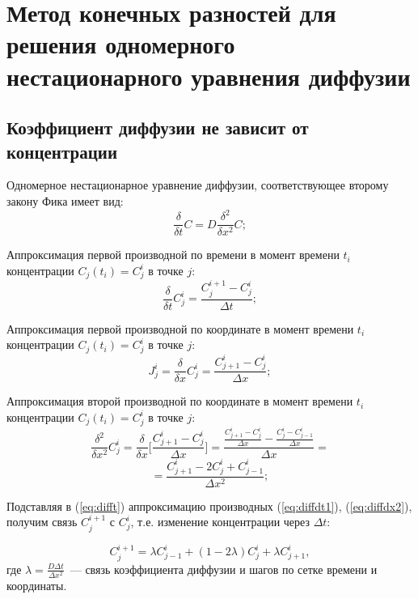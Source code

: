 \section{Метод конечных разностей для решения одномерного нестационарного уравнения диффузии}
\subsection{Коэффициент диффузии не зависит от концентрации}
Одномерное нестационарное уравнение диффузии, соответствующее второму закону Фика имеет вид:
\begin{equation}\label{eq:difft}
	\frac{\delta}{\delta t} C = D\frac{\delta^{2}}{\delta x^2} C;
\end{equation}

Аппроксимация первой производной по времени в момент времени $t_{i}$ концентрации $C_{j}(t_{i}) = C^{i}_{j}$ в точке $j$:
\begin{equation}\label{eq:diffdt1}
	\frac{\delta}{\delta t} C^{i}_{j} = \frac{C^{i+1}_{j} - C^{i}_{j}}{\Delta t};
\end{equation}

Аппроксимация первой производной по координате в момент времени $t_{i}$ концентрации $C_{j}(t_{i}) = C^{i}_{j}$ в точке $j$:
\begin{equation}\label{eq:diffdx1}
	J^{i}_{j} = \frac{\delta}{\delta x} C^{i}_{j} = \frac{C^{i}_{j+1} - C^{i}_{j}}{\Delta x};
\end{equation}

Аппроксимация второй производной по координате в момент времени $t_{i}$ концентрации $C_{j}(t_{i}) = C^{i}_{j}$ в точке $j$:
\begin{equation*}
	\frac{\delta^{2}}{\delta x^{2}} C^{i}_{j} = \frac{\delta}{\delta x}\bigg[ \frac{C^{i}_{j+1} - C^{i}_{j}}{\Delta x} \bigg] = \frac{ \frac{C^{i}_{j+1} - C^{i}_{j}}{\Delta x} - \frac{C^{i}_{j} - C^{i}_{j-1}}{\Delta x}}{\Delta x} = 
\end{equation*}
\begin{equation}\label{eq:diffdx2}
	= \frac{C^{i}_{j+1} - 2C^{i}_{j} + C^{i}_{j-1}}{\Delta x^2};
\end{equation}

Подставляя в (\ref{eq:difft}) аппроксимацию производных (\ref{eq:diffdt1}), (\ref{eq:diffdx2}), получим связь $C^{i+1}_{j}$ с $C^{i}_{j}$, т.е. изменение концентрации через $\Delta t$:

\begin{equation}\label{eq:diffFD}
	C^{i+1}_{j} = \lambda C^{i}_{j-1} + (1 - 2\lambda)C^{i}_{j} + \lambda C^{i}_{j+1},
\end{equation}
где $\lambda = \frac{D\Delta t}{\Delta x^2}$~---  связь коэффициента диффузии и шагов по сетке времени и координаты.

